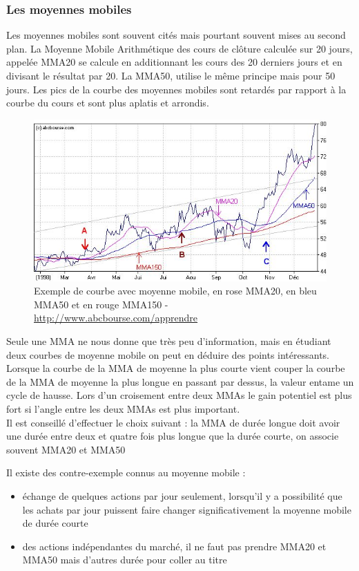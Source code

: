 \subsubsection{Les moyennes mobiles}
Les moyennes mobiles sont souvent cités mais pourtant souvent mises au second plan.  La Moyenne Mobile Arithmétique des cours de clôture calculée sur 20 jours, appelée MMA20 se calcule en additionnant les cours des 20 derniers jours et en divisant le résultat par 20. La MMA50, utilise le même principe mais pour 50 jours. Les pics de la courbe des moyennes mobiles sont retardés par rapport à la courbe du cours et sont plus aplatis et arrondis. 

\begin{figure}[H]
  \center
  \includegraphics[scale=0.5]{../graph/moyennemobile.png} 
  \caption{Exemple de courbe avec moyenne mobile, en rose MMA20, en bleu MMA50 et en rouge MMA150 - \url{http://www.abcbourse.com/apprendre}}
\end{figure} 

Seule une MMA ne nous donne que très peu d’information, mais en étudiant deux courbes de moyenne mobile on peut en déduire des points intéressants. Lorsque la courbe de la MMA de moyenne la plus courte vient couper la courbe de la MMA de moyenne la plus longue en passant par dessus, la valeur entame un cycle de hausse. Lors d'un croisement entre deux MMAs le gain potentiel est plus fort si l’angle entre les deux MMAs est plus important. \\

Il est conseillé d'effectuer le choix suivant : la MMA de durée longue doit avoir une durée entre deux et quatre fois plus longue que la durée courte, on associe souvent MMA20 et MMA50

Il existe des contre-exemple connus au moyenne mobile :
\begin{itemize}
\item échange de quelques actions par jour seulement, lorsqu'il y a possibilité que les achats par jour puissent faire changer significativement la moyenne mobile de durée courte
\item des actions indépendantes du marché, il ne faut pas prendre MMA20 et MMA50 mais d'autres durée pour coller au titre
\end{itemize}


